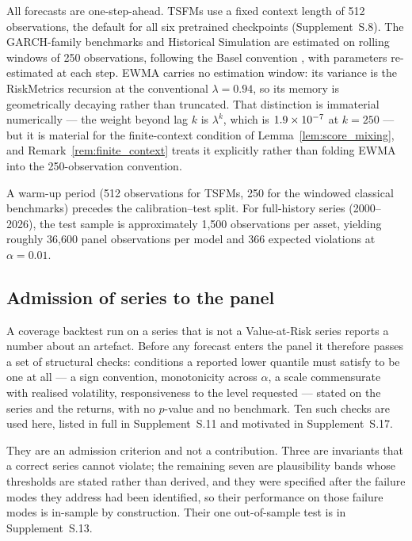\documentclass[preprint,11pt,authoryear]{elsarticle}
\newcommand{\1}{\boldsymbol{1}}
\begin{document}
All forecasts are one-step-ahead. TSFMs use a fixed context length of 512 observations, the default for all six pretrained checkpoints (Supplement~S.8). The GARCH-family benchmarks and Historical Simulation are estimated on rolling windows of 250 observations, following the Basel convention \citep{basel1996}, with parameters re-estimated at each step. EWMA carries no estimation window: its variance is the RiskMetrics recursion at the conventional $\lambda = 0.94$, so its memory is geometrically decaying rather than truncated. That distinction is immaterial numerically --- the weight beyond lag $k$ is $\lambda^k$, which is $1.9\times 10^{-7}$ at $k = 250$ --- but it is material for the finite-context condition of Lemma~\ref{lem:score_mixing}, and Remark~\ref{rem:finite_context} treats it explicitly rather than folding EWMA into the 250-observation convention.

A warm-up period (512 observations for TSFMs, 250 for the windowed classical benchmarks) precedes the calibration--test split. For full-history series (2000--2026), the test sample is approximately 1{,}500 observations per asset, yielding roughly 36{,}600 panel observations per model and 366 expected violations at $\alpha = 0.01$.




\subsection{Admission of series to the panel}
\label{sec:gate}

A coverage backtest run on a series that is not a Value-at-Risk series reports a
number about an artefact. Before any forecast enters the panel it therefore
passes a set of structural checks: conditions a reported lower quantile must
satisfy to be one at all --- a sign convention, monotonicity across $\alpha$, a
scale commensurate with realised volatility, responsiveness to the level
requested --- stated on the series and the returns, with no $p$-value and no
benchmark. Ten such checks are used here, listed in full in Supplement~S.11 and
motivated in Supplement~S.17.

They are an admission criterion and not a contribution. Three are invariants that
a correct series cannot violate; the remaining seven are plausibility bands whose
thresholds are stated rather than derived, and they were specified after the
failure modes they address had been identified, so their performance on those
failure modes is in-sample by construction. Their one out-of-sample test is in
Supplement~S.13.
\end{document}
